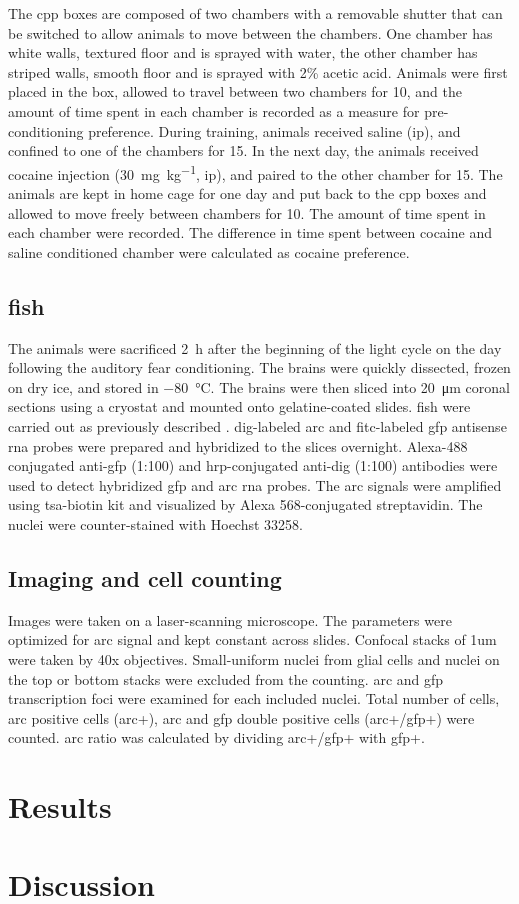  The \gls{cpp} boxes are composed of two chambers with a removable shutter that can be switched to allow animals to move between the chambers. One chamber has white walls, textured floor and is sprayed with water, the other chamber has striped walls, smooth floor and is sprayed with 2\% acetic acid. Animals were first placed in the box, allowed to travel between two chambers for \SI{10}{\min}, and the amount of time spent in each chamber is recorded as a measure for pre-conditioning preference. During training, animals received saline (\gls{ip}), and confined to one of the chambers for \SI{15}{\min}. In the next day, the animals received cocaine injection (\SI{30}{\mg\per\kg}, \gls{ip}), and paired to the other chamber for \SI{15}{\min}. The animals are kept in home cage for one day and put back to the \gls{cpp} boxes and allowed to move freely between chambers for \SI{10}{\min}. The amount of time spent in each chamber were recorded. The difference in time spent between cocaine and saline conditioned chamber were calculated as cocaine preference.

\subsection{\Acrlong{fish}}
The animals were sacrificed \SI{2}{\hour} after the beginning of the light cycle on the day following the auditory fear conditioning. The brains were quickly dissected, frozen on dry ice, and stored in \SI{-80}{\celsius}. The brains were then sliced into \SI{20}{\um} coronal sections using a cryostat and mounted onto gelatine-coated slides. \Gls{fish} were carried out as previously described \citep{guzowski99}. \gls{dig}-labeled \gls{arc} and \gls{fitc}-labeled \gls{gfp} antisense \gls{rna} probes were prepared and hybridized to the slices overnight. Alexa-488 conjugated anti-\gls{gfp} (1:100) and \gls{hrp}-conjugated anti-\gls{dig} (1:100) antibodies were used to detect hybridized \gls{gfp} and \gls{arc} \gls{rna} probes. The \gls{arc} signals were amplified using \gls{tsa}-biotin kit and visualized by Alexa 568-conjugated streptavidin. The nuclei were counter-stained with Hoechst 33258.

\subsection{Imaging and cell counting}
Images were taken on a laser-scanning microscope. The parameters were optimized for \gls{arc} signal and kept constant across slides. Confocal stacks of 1um were taken by 40x objectives. Small-uniform nuclei from glial cells and nuclei on the top or bottom stacks were excluded from the counting. \gls{arc} and \gls{gfp} transcription foci  were examined for each included nuclei. Total number of cells, \gls{arc} positive cells (\gls{arc}+), \gls{arc} and \gls{gfp} double positive cells (\gls{arc}+/\gls{gfp}+) were counted. \gls{arc} ratio was calculated by dividing \gls{arc}+/\gls{gfp}+ with \gls{gfp}+.

\section{Results}
\section{Discussion}
